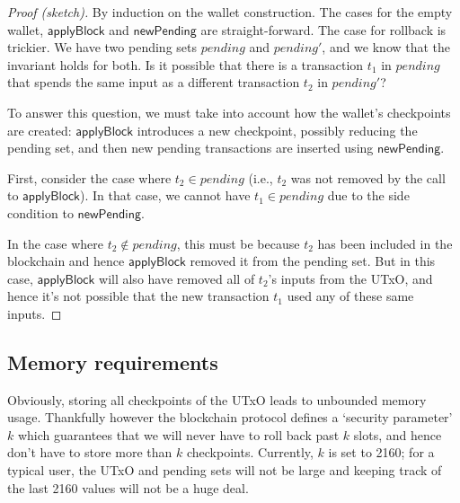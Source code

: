 \documentclass{article}
\theoremstyle{definition}{
  \newtheorem{lemma}{Lemma}[section] %
  \newtheorem{definition}[lemma]{Definition}
}
\theoremstyle{theorem}{
  \newtheorem{invariant}[lemma]{Invariant}
  \newtheorem{proofobligation}[lemma]{Proof Obligation}
}
\numberwithin{equation}{lemma}
\begin{document}
\begin{proof}[Proof (sketch)]
By induction on the wallet construction. The cases for the empty wallet,
$\mathsf{applyBlock}$ and $\mathsf{newPending}$ are straight-forward.
The case for rollback is trickier. We have two pending sets
$\mathit{pending}$ and $\mathit{pending'}$, and we know that the invariant
holds for both. Is it possible that there is a transaction $t_1$ in $\mathit{pending}$
that spends the same input as a different transaction $t_2$ in $\mathit{pending}'$?

To answer this question, we must take into account how the wallet's checkpoints
are created: $\mathsf{applyBlock}$ introduces a new checkpoint, possibly
reducing the pending set, and then new pending transactions are inserted using
$\mathsf{newPending}$.

First, consider the case where $t_2 \in \mathit{pending}$ (i.e., $t_2$ was not
removed by the call to $\mathsf{applyBlock}$). In that case, we cannot have $t_1
\in \mathit{pending}$ due to the side condition to $\mathsf{newPending}$.

In the case where $t_2 \notin \mathit{pending}$, this must be because $t_2$
has been included in the blockchain and hence $\mathsf{applyBlock}$ removed
it from the pending set. But in this case, $\mathsf{applyBlock}$ will also
have removed all of $t_2$'s inputs from the UTxO, and hence it's not possible
that the new transaction $t_1$ used any of these same inputs.
\end{proof}


\subsection{Memory requirements}

Obviously, storing all checkpoints of the UTxO leads to unbounded memory usage.
Thankfully however the blockchain protocol defines a `security parameter' $k$
which guarantees that we will never have to roll back past $k$ slots, and hence
don't have to store more than $k$ checkpoints. Currently, $k$ is set to 2160;
for a typical user, the UTxO and pending sets will not be large and keeping
track of the last 2160 values will not be a huge deal.

\end{document}
